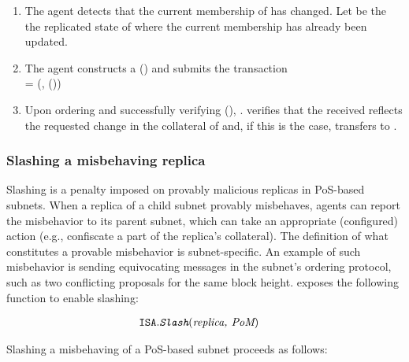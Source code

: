 \begin{enumerate}
    \item The \ipc agent detects that the current membership of  has changed.
    Let  be the the replicated state of  where the current membership has already been updated.

    \item The \ipc agent constructs a {\pof}() and submits the transaction\\
     = (, {\pof}())

    \item Upon ordering  and successfully verifying {\pof}(),
    . verifies that the received  reflects the requested change in the collateral of 
    and, if this is the case, transfers  to .
    
\end{enumerate}

\subsubsection{Slashing a misbehaving replica}
\label{sec:slash}
Slashing is a penalty imposed on provably malicious replicas in PoS-based subnets.
When a replica of a child subnet provably misbehaves, \ipc agents can report the misbehavior to its parent subnet,
which can take an appropriate (configured) action (e.g., confiscate a part of the replica's collateral).
The definition of what constitutes a provable misbehavior is subnet-specific.
An example of such misbehavior is sending equivocating messages in the subnet's ordering protocol, such as two conflicting \glspl{proposal} for the same block height.
\ipc exposes the following function to enable slashing:

\begin{align*}
    \texttt{ISA}.&\textit{\texttt{Slash}}(\textit{replica, PoM})
\end{align*}

Slashing a misbehaving  of a PoS-based subnet  proceeds as follows:

